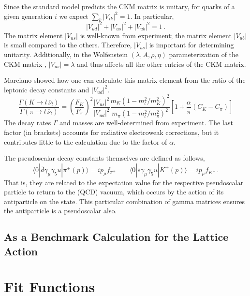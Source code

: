 \documentclass[prd,tightenlines,preprintnumbers,showpacs,superscriptaddress,notitlepage,eqsecnum,floatfix,notitlepage]{revtex4-1}
\begin{document}
Since the standard model predicts the CKM matrix is unitary, for quarks of a given generation $i$ we expect $\sum_k |V_{ik}|^2 = 1$. In particular,
\begin{equation}
|V_{ud}|^2 + |V_{us}|^2 + |V_{ub}|^2 = 1 \, .
\end{equation} 
The matrix element $|V_{us}|$ is well-known from experiment; the matrix element $|V_{ub}|$ is small compared to the others. Therefore, $|V_{us}|$ is important for determining unitarity. Additionally, in the Wolfenstein  $(\lambda, A, \overline{\rho}, \overline{\eta})$ parameterization of the CKM matrix \cite{Wolfenstein:1983yz}, $|V_{us}| = \lambda$ and thus affects all the other entries of the CKM matrix.

Marciano \cite{Marciano:2004uf, Durr:2010hr} showed how one can calculate this matrix element from the ratio of the leptonic decay constants and $|V_{ud}|^2$.
\begin{equation}
\frac{\Gamma(K \rightarrow l \, \overline{\nu}_l)}{\Gamma(\pi \rightarrow l \, \overline{\nu}_l)} =
\left(\frac{F_K}{F_\pi} \right)^2 \frac{|V_{us}|^2}{|V_{ud}|^2} \frac{m_K (1 - m_l^2/ m_K^2)^2}{m_\pi (1 - m_l^2/ m_\pi^2)^2} \left[ 1 + \frac{\alpha}{\pi}(C_K - C_\pi) \right]
\end{equation}
The decay rates $\Gamma$ and masses are well-determined from experiment. The last factor (in brackets) accounts for radiative electroweak corrections, but it contributes little to the calculation due to the factor of $\alpha$.

The pseudoscalar decay constants themselves are defined as follows,
\begin{equation}
\langle 0 | \overline{d} \gamma_\mu \gamma_5 u | \pi^+(p) \rangle = i p_\mu f_{\pi^+}
\qquad 
\langle 0 | \overline{s} \gamma_\mu \gamma_5 u | K^+(p) \rangle = i p_\mu f_{K^+} \, .
\end{equation}
That is, they are related to the expectation value for the respective pseudoscalar particle to return to the (QCD) vacuum, which occurs by the action of its antiparticle on the state. This particular combination of gamma matrices ensures the antiparticle is a pseudoscalar also.

\subsection{As a Benchmark Calculation for the Lattice Action}


\section{Fit Functions} \label{Fit Functions}
\end{document}
